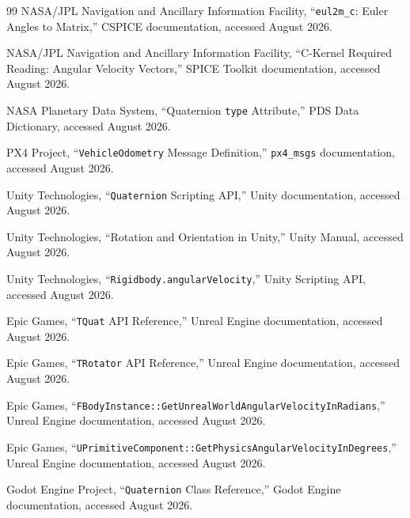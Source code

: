 \documentclass[11pt]{article}
\begin{document}
\begin{thebibliography}{99}
        NASA/JPL Navigation and Ancillary Information Facility,
        ``\texttt{eul2m\_c}: Euler Angles to Matrix,''
        CSPICE documentation, accessed August 2026.

        NASA/JPL Navigation and Ancillary Information Facility,
        ``C-Kernel Required Reading: Angular Velocity Vectors,''
        SPICE Toolkit documentation, accessed August 2026.

        NASA Planetary Data System,
        ``Quaternion \texttt{type} Attribute,''
        PDS Data Dictionary, accessed August 2026.

        PX4 Project,
        ``\texttt{VehicleOdometry} Message Definition,''
        \texttt{px4\_msgs} documentation, accessed August 2026.

        Unity Technologies,
        ``\texttt{Quaternion} Scripting API,''
        Unity documentation, accessed August 2026.

        Unity Technologies,
        ``Rotation and Orientation in Unity,''
        Unity Manual, accessed August 2026.

        Unity Technologies,
        ``\texttt{Rigidbody.angularVelocity},''
        Unity Scripting API, accessed August 2026.

        Epic Games,
        ``\texttt{TQuat} API Reference,''
        Unreal Engine documentation, accessed August 2026.

        Epic Games,
        ``\texttt{TRotator} API Reference,''
        Unreal Engine documentation, accessed August 2026.

        Epic Games,
        ``\texttt{FBodyInstance::GetUnrealWorldAngularVelocityInRadians},''
        Unreal Engine documentation, accessed August 2026.

        Epic Games,
        ``\texttt{UPrimitiveComponent::GetPhysicsAngularVelocityInDegrees},''
        Unreal Engine documentation, accessed August 2026.

        Godot Engine Project,
        ``\texttt{Quaternion} Class Reference,''
        Godot Engine documentation, accessed August 2026.


\end{thebibliography}
\end{document}
